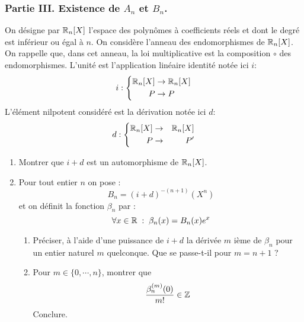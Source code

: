 \subsubsection*{Partie III. Existence de $A_n$ et $B_n$.}
On désigne par $\mathbb{R}_n [X]$ l'espace des polynômes à coefficients réels et dont le degré est inférieur ou égal à $n$. On considère l'anneau des endomorphismes de $\mathbb{R}_n [X]$. On rappelle que, dans cet anneau, la loi multiplicative est la composition $\circ$ des endomorphismes.\newline
L'unité est l'application linéaire identité notée ici $i$:
\begin{displaymath}
i : 
\left\lbrace
\begin{aligned}
\mathbb{R}_n[X] & \rightarrow  \mathbb{R}_n[X] \\ 
P & \rightarrow  P
\end{aligned}
 \right. 
\end{displaymath}
L'élément nilpotent considéré est la dérivation notée ici $d$:
\begin{displaymath}
d : 
\left\lbrace 
\begin{aligned}
\mathbb{R}_n[X] & \rightarrow & \mathbb{R}_n[X] \\ 
P & \rightarrow & P^\prime
\end{aligned}
\right. 
\end{displaymath}
\begin{enumerate}
 \item Montrer que $i+d$ est un automorphisme de $\mathbb{R}_n[X]$.
\item Pour tout entier $n$ on pose :
\[B_n=(i+d)^{-(n+1)}(X^n)\]
et on définit la fonction $\beta_n$ par :
\[\forall x\in \mathbb{R} \; : \; \beta_n (x)=B_n(x)e^x\]
\begin{enumerate}
 \item Préciser, à l'aide d'une puissance de $i+d$ la dérivée $m$ ième de $\beta_n$ pour un entier naturel $m$ quelconque. Que se passe-t-il pour $m=n+1$ ?
\item Pour $m\in \{0, \cdots, n\}$, montrer que 
\[\frac{\beta_n^{(m)}(0)}{m!} \in \mathbb{Z}\]
Conclure.
\end{enumerate}

\end{enumerate}

